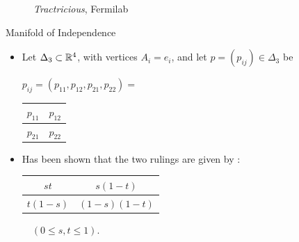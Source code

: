 \begin{frame}
\begin{figure}[!htb]
\begin{minipage}{.3\textwidth}
        \caption{\emph{Tractricious}, Fermilab}
    \end{minipage}
    \end{figure}

\end{frame}

\begin{frame}{Manifold of Independence}

    \begin{itemize}
        \item Let $\Delta_{3} \subset \mathbb{R}^{4}$, with vertices $A_{i} = e_{i}$, and let $p = (p_{ij}) \in \Delta_{3}$ be
        \vspace{-6pt}
        \begin{center}
        \begin{table}[]
        $p_{ij} = (p_{11}, p_{12}, p_{21}, p_{22}) =$ 
        \begin{tabular}{|l|l|}
        \hline
        $p_{11}$ & $p_{12}$ \\ \hline
        $p_{21}$ & $p_{22}$ \\ \hline
        \end{tabular}
        \end{table}
        \end{center}

    \item Has been shown that the two rulings are given by \cite{SFJG1970}:
    
    \begin{center}
    \begin{table}[]
    \begin{tabular}{|c|c|}
    \hline
    $st$ & $s(1-t)$ \\ \hline
    $t(1-s)$ & $(1-s)(1-t)$ \\ \hline
    \end{tabular}
    $\quad (0 \leq s,t \leq 1).$
    \end{table}
    \end{center}
    
    \end{itemize}


\end{frame}
